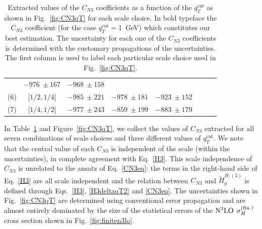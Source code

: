 \documentclass[12pt]{article}
\DeclareRobustCommand{\qtcut}{\ensuremath{q_T^\mathrm{cut}}}
\begin{document}
\begin{table}
\begin{tabular}{ |c|c||c|c|c|c|c|c| }
& $ -976~\pm 167$%

& $ -968~\pm 158$%

 \\
 
\multirow{1}{*}{(6)} 

& $ \big[1/2,1/4 \big]$

& $ -985~\pm 221$ %

& $ -978~\pm 181$%

& $-923~\pm 152$%

\\

\multirow{1}{*}{(7)} 

& $\big[1/4,1/2 \big]$

& $ -977~\pm 243$ %

& $ -859~\pm 199$%

& $ -883~\pm 179$%
\\

\hline

\end{tabular}

\caption{\label{Table:CN3values}
{Extracted values of the $C_{N3}$ coefficients as a function of the $\qtcut$ as shown in Fig.~\ref{fig:CN3qT} for each scale choice. In bold typeface the $C_{N3}$ coefficient (for the case $\qtcut=$1~GeV) which constitutes our best estimation. The uncertainty for each one of the $C_{N3}$ coefficients is determined with the customary propagations of the uncertainties. The first column is used to label each particular scale choice used in Fig.~\ref{fig:CN3qT}.
}
}
\renewcommand{\arraystretch}{1}
\end{table}

In Table~\ref{Table:CN3values} and Figure~\ref{fig:CN3qT},
we collect the values of $C_{N3}$ extracted for all seven combinations of scale 
choices and three different values of $\qtcut$. 
We note that the central value of each $C_{N3}$ is independent of the scale (within the uncertainties), in complete agreement with Eq.~\eqref{H3}. This scale independence of $C_{N3}$ is unrelated to the ansatz of Eq.~\eqref{CN3eq}: the terms in the right-hand side of Eq.~\eqref{H3} are all scale independent and the relation between $C_{N3}$ and $\widetilde{H}^{H;(3)}_{g}$ is defined through Eqs.~\eqref{H3}, \eqref{H3deltaqT2} and \eqref{CN3eq}. The uncertainties shown in Fig.~\ref{fig:CN3qT} are determined using conventional error propagation and are almost entirely dominated by the size of the statistical errors of the $\rm N^3LO$ $\sigma_{H}^{(\rm fin.)}$ cross section shown in Fig.~\ref{fig:finiten3lo}.
\end{document}
